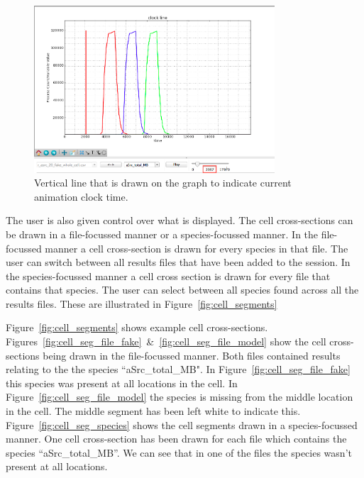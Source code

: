 \begin{figure}[h!]
    \centering
    \includegraphics[width=0.8\textwidth]{images/animation_clock_line.png}
    \caption{Vertical line that is drawn on the graph to indicate current animation clock time.}
    \label{fig:animation_clock}
\end{figure}

The user is also given control over what is displayed.  The cell cross-sections can be drawn in a file-focussed manner or a species-focussed manner.  In the file-focussed manner a cell cross-section is drawn for every species in that file.  The user can switch between all results files that have been added to the session.  In the species-focussed manner a cell cross section is drawn for every file that contains that species.  The user can select between all species found across all the results files.  These are illustrated in Figure~\ref{fig:cell_segments}

Figure~\ref{fig:cell_segments} shows example cell cross-sections.  Figures~\ref{fig:cell_seg_file_fake}~\&~\ref{fig:cell_seg_file_model} show the cell cross-sections being drawn in the file-focussed manner.  Both files contained results relating to the the species ``aSrc\_total\_MB". In Figure~\ref{fig:cell_seg_file_fake} this species was present at all locations in the cell.  In Figure~\ref{fig:cell_seg_file_model} the species is missing from the middle location in the cell.  The middle segment has been left white to indicate this.  Figure~\ref{fig:cell_seg_species} shows the cell segments drawn in a species-focussed manner.  One cell cross-section has been drawn for each file which contains the species ``aSrc\_total\_MB''.  We can see that in one of the files the species wasn't present at all locations.

